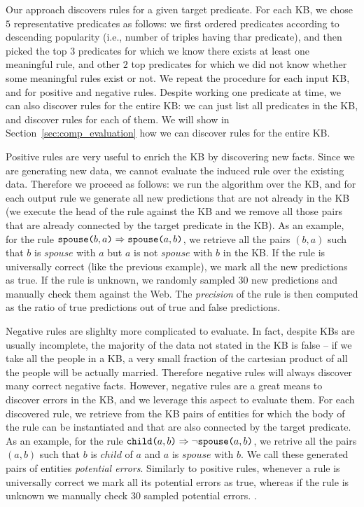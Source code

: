 Our approach discovers rules for a given target predicate. For each KB, we chose $5$ representative predicates as follows: we first ordered predicates according to descending popularity (i.e., number of triples having thar predicate), and then picked the top $3$ predicates for which we know there exists at least one meaningful rule, and other $2$ top predicates for which we did not know whether some meaningful rules exist or not. We repeat the procedure for each input KB, and for positive and negative rules. Despite working one predicate at time, we can also discover rules for the entire KB: we can just list all predicates in the KB, and discover rules for each of them. We will show in Section~\ref{sec:comp_evaluation} how we can discover rules for the entire KB.

Positive rules are very useful to enrich the KB by discovering new facts. Since we are generating new data, we cannot evaluate the induced rule over the existing data. Therefore we proceed as follows: we run the algorithm over the KB, and for each output rule we generate all new predictions that are not already in the KB (we execute the head of the rule against the KB and we remove all those pairs that are already connected by the target predicate in the KB). As an example, for the rule $\texttt{spouse(}b,a\texttt{)} \Rightarrow \texttt{spouse(}a,b\texttt{)}$, we retrieve all the pairs $(b,a)$ such that $b$ is $spouse$ with $a$ but $a$ is not $spouse$ with $b$ in the KB. If the rule is universally correct (like the previous example), we mark all the new predictions as true. If the rule is unknown, we randomly sampled 30 new predictions and manually check them against the Web. The \emph{precision} of the rule is then computed as the ratio of true predictions out of true and false predictions.

Negative rules are slighlty more complicated to evaluate. In fact, despite KBs are usually incomplete, the majority of the data not stated in the KB is false -- if we take all the people in a KB, a very small fraction of the cartesian product of all the people will be actually married. Therefore negative rules will always discover many correct negative facts. However, negative rules are a great means to discover errors in the KB, and we leverage this aspect to evaluate them. For each discovered rule, we retrieve from the KB pairs of entities for which the body of the rule can be instantiated and that are also connected by the target predicate. As an example, for the rule $\texttt{child(}a,b\texttt{)} \Rightarrow \neg \texttt{spouse(}a,b\texttt{)}$, we retrive all the pairs $(a,b)$ such that $b$ is $child$ of $a$ and $a$ is $spouse$ with $b$. We call these generated pairs of entities \emph{potential errors}. Similarly to positive rules, whenever a rule is universally correct we mark all its potential errors as true, whereas if the rule is unknown we manually check 30 sampled potential errors.
.

